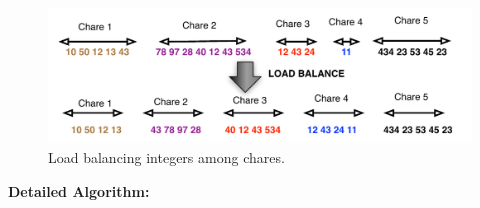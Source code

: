 \documentclass{article}
\begin{document}


\begin{figure}[h]
\centering
\includegraphics[width=\textwidth]{prob1.pdf}
\caption{Load balancing integers among chares.}
\label{prefix}
\end{figure}


\textbf{Detailed Algorithm:} 
\end{document}
